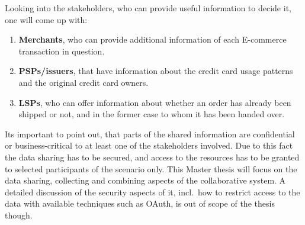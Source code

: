 Looking into the stakeholders, who can provide useful information to decide it, one will come up with:\@

\begin{enumerate}
    \item \textbf{Merchants}, who can provide additional information of each \gls{E-commerce} transaction in question.
    \item \textbf{\gls{PSP}s/issuers}, that have information about the credit card usage patterns and the original credit card owners.
    \item \textbf{\gls{LSP}s}, who can offer information about whether an order has already been shipped or not, and in the former case to whom it has been handed over.
\end{enumerate}

Its important to point out, that parts of the shared information are confidential or business-critical to at least one of the stakeholders involved. Due to this fact the data sharing has to be secured, and access to the resources has to be granted to selected participants of the scenario only. This Master thesis will focus on the data sharing, collecting and combining aspects of the collaborative system. A detailed discussion of the security aspects of it, incl.\ how to restrict access to the data with available techniques such as \gls{OAuth}, is out of scope of the thesis though.

